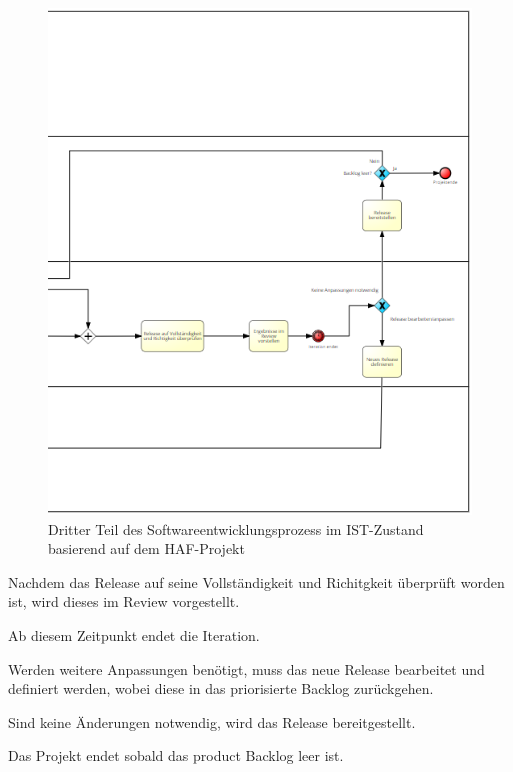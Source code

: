 \begin{figure}[h]
    \centering
    \includegraphics[scale=0.8]{Bilder/IST-Prozess_third Part.png}
    \caption{Dritter Teil des Softwareentwicklungsprozess im IST-Zustand basierend auf dem HAF-Projekt}
\end{figure}

Nachdem das Release auf seine Vollständigkeit und Richitgkeit überprüft worden ist, wird dieses im Review vorgestellt. 

Ab diesem Zeitpunkt endet die Iteration. 

Werden weitere Anpassungen benötigt, muss das neue Release bearbeitet und definiert werden, wobei diese in das priorisierte Backlog zurückgehen.

Sind keine Änderungen notwendig, wird das Release bereitgestellt. 

Das Projekt endet sobald das product Backlog leer ist.















